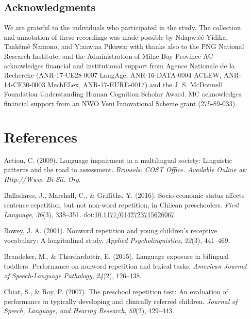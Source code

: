 \documentclass[english,,man,floatsintext]{apa6}
\begin{document}
\newpage

\subsection{Acknowledgments}\label{acknowledgments}

We are grateful to the individuals who participated in the study. The
collection and annotation of these recordings was made possible by
Ndapw:éé Yidika, Taakêmê Ńamono, and Y:aaw:aa Pikuwa; with thanks also
to the PNG National Research Institute, and the Administration of Milne
Bay Province AC acknowledges financial and institutional support from
Agence Nationale de la Recherche (ANR-17-CE28-0007 LangAge,
ANR-16-DATA-0004 ACLEW, ANR-14-CE30-0003 MechELex, ANR-17-EURE-0017) and
the J. S. McDonnell Foundation Understanding Human Cognition Scholar
Award. MC acknowledges financial support from an NWO Veni Innovational
Scheme grant (275-89-033).

\section{References}\label{references}

\setlength{\parindent}{-0.5in} \setlength{\leftskip}{0.5in}

\hypertarget{refs}{}
\hypertarget{ref-is08042009language}{}
Action, C. (2009). Language impairment in a multilingual society:
Linguistic patterns and the road to assessment. \emph{Brussels: COST
Office. Available Online at: Http://Www. Bi-Sli. Org}.

\hypertarget{ref-balladares2016socio}{}
Balladares, J., Marshall, C., \& Griffiths, Y. (2016). Socio-economic
status affects sentence repetition, but not non-word repetition, in
Chilean preschoolers. \emph{First Language}, \emph{36}(3), 338--351.
doi:\href{https://doi.org/10.1177/0142723715626067}{10.1177/0142723715626067}

\hypertarget{ref-bowey2001nonword}{}
Bowey, J. A. (2001). Nonword repetition and young children's receptive
vocabulary: A longitudinal study. \emph{Applied Psycholinguistics},
\emph{22}(3), 441--469.

\hypertarget{ref-brandeker2015language}{}
Brandeker, M., \& Thordardottir, E. (2015). Language exposure in
bilingual toddlers: Performance on nonword repetition and lexical tasks.
\emph{American Journal of Speech-Language Pathology}, \emph{24}(2),
126--138.

\hypertarget{ref-chiat2007preschool}{}
Chiat, S., \& Roy, P. (2007). The preschool repetition test: An
evaluation of performance in typically developing and clinically
referred children. \emph{Journal of Speech, Language, and Hearing
Research}, \emph{50}(2), 429--443.
\end{document}

